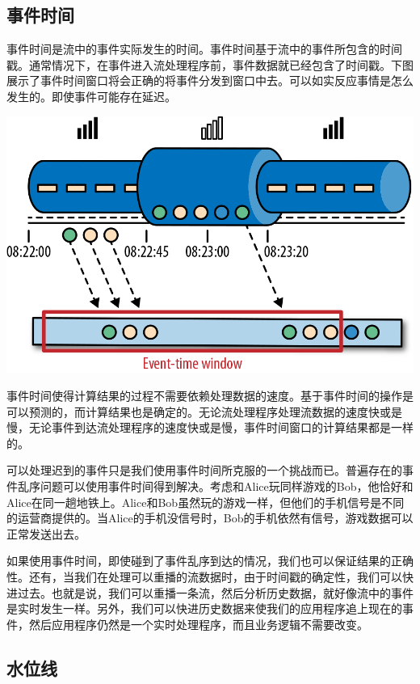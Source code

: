 \documentclass[cn,11pt,chinese]{elegantbook}
\begin{document}
\hypertarget{ux4e8bux4ef6ux65f6ux95f4}{%
\subsection{事件时间}\label{ux4e8bux4ef6ux65f6ux95f4}}

事件时间是流中的事件实际发生的时间。事件时间基于流中的事件所包含的时间戳。通常情况下，在事件进入流处理程序前，事件数据就已经包含了时间戳。下图展示了事件时间窗口将会正确的将事件分发到窗口中去。可以如实反应事情是怎么发生的。即使事件可能存在延迟。

\includegraphics{images/spaf_0213.png}

事件时间使得计算结果的过程不需要依赖处理数据的速度。基于事件时间的操作是可以预测的，而计算结果也是确定的。无论流处理程序处理流数据的速度快或是慢，无论事件到达流处理程序的速度快或是慢，事件时间窗口的计算结果都是一样的。

可以处理迟到的事件只是我们使用事件时间所克服的一个挑战而已。普遍存在的事件乱序问题可以使用事件时间得到解决。考虑和Alice玩同样游戏的Bob，他恰好和Alice在同一趟地铁上。Alice和Bob虽然玩的游戏一样，但他们的手机信号是不同的运营商提供的。当Alice的手机没信号时，Bob的手机依然有信号，游戏数据可以正常发送出去。

如果使用事件时间，即使碰到了事件乱序到达的情况，我们也可以保证结果的正确性。还有，当我们在处理可以重播的流数据时，由于时间戳的确定性，我们可以快进过去。也就是说，我们可以重播一条流，然后分析历史数据，就好像流中的事件是实时发生一样。另外，我们可以快进历史数据来使我们的应用程序追上现在的事件，然后应用程序仍然是一个实时处理程序，而且业务逻辑不需要改变。

\hypertarget{ux6c34ux4f4dux7ebf}{%
\subsection{水位线}\label{ux6c34ux4f4dux7ebf}}
\end{document}
